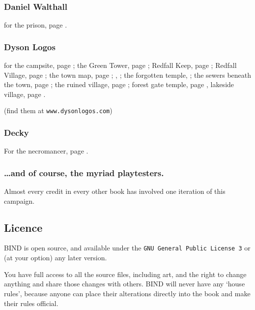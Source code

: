 \begin{multicols}{2}
\subsubsection*{Daniel Walthall}
for the prison, page \pageref{Daniel_Walthall/prison}.

\subsubsection*{Dyson Logos}

for the
campsite, page \pageref{Dyson_Logos/forgotten_city};
the Green Tower, page \pageref{Dyson_Logos/green_tower};
Redfall Keep, page \pageref{Dyson_Logos/redfall_keep};
Redfall Village, page \pageref{Dyson_Logos/redfall};
the town map, page \pageref{Dyson_Logos/town};
, \pageref{Dyson_Logos/mincing_pig};
the forgotten temple, \pageref{Dyson_Logos/qualme_temple};
the sewers beneath the town, page \pageref{Dyson_Logos/sewer};
the ruined village, page \pageref{Dyson_Logos/ruined_village};
forest gate temple, page \pageref{Dyson_Logos/shadow_gate},
lakeside village, page \pageref{Dyson_Logos/lakeside}.

(find them at {\tt www.dysonlogos.com})

\subsubsection*{Decky}

For the necromancer, page \pageref{Decky/necromancer}.

\subsubsection*{\ldots and of course, the myriad playtesters.}
Almost every credit in every other book has involved one iteration of this campaign.

\end{multicols}

\subsection*{Licence}

BIND is open source, and available under the {\tt GNU General Public License 3} or (at your option) any later version.

You have full access to all the source files, including art, and the right to change anything and share those changes with others.
BIND will never have any `house rules', because anyone can place their alterations directly into the book and make their rules official.

\pagebreak
